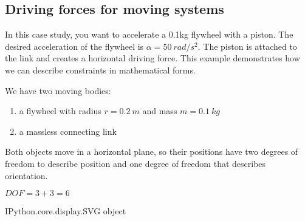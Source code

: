 \documentclass[letterpaper,10pt,english]{sphinxmanual}
\begin{document}
\subsection{Driving forces for moving systems}
\label{\detokenize{module_01/driving-forces:driving-forces-for-moving-systems}}\label{\detokenize{module_01/driving-forces::doc}}
In this case study, you want to accelerate a 0.1\sphinxhyphen{}kg flywheel with a
piston. The desired
acceleration of the flywheel is \(\alpha=50~rad/s^2.\) The piston is
attached to the link and creates a horizontal driving force. This
example demonstrates how we can describe constraints in mathematical
forms.

We have two moving bodies:
\begin{enumerate}
%
\item {} 
a flywheel with radius \(r=0.2~m\) and mass \(m=0.1~kg\)

\item {} 
a massless connecting link

\end{enumerate}

Both objects move in a horizontal plane, so their positions have two
degrees of freedom to describe position and one degree of freedom that
describes orientation.

\(DOF = 3 + 3 = 6\)

\begin{sphinxVerbatim}[commandchars=\\\{\}]
   

\end{sphinxVerbatim}

\begin{sphinxVerbatim}[commandchars=\\\{\}]
\PYGZlt{}IPython.core.display.SVG object\PYGZgt{}
\end{sphinxVerbatim}
\end{document}
